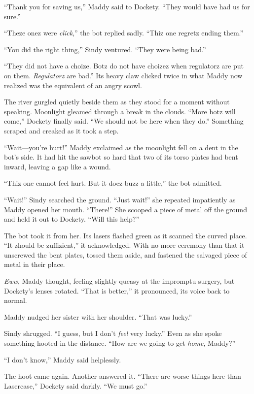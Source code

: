 \documentclass[10pt]{article}
\begin{document}
``Thank you for saving us,'' Maddy said to Dockety. ``They would have
had us for sure.''

``Theze onez were \emph{click},'' the bot replied sadly. ``Thiz one
regretz ending them.''

``You did the right thing,'' Sindy ventured. ``They were being bad.''

``They did not have a choize. Botz do not have choizez when regulatorz
are put on them. \emph{Regulatorz} are bad.'' Its heavy claw clicked
twice in what Maddy now realized was the equivalent of an angry scowl.

The river gurgled quietly beside them as they stood for a moment without
speaking. Moonlight gleamed through a break in the clouds. ``More botz
will come,'' Dockety finally said. ``We should not be here when they
do.'' Something scraped and creaked as it took a step.

``Wait---you're hurt!'' Maddy exclaimed as the moonlight fell on a dent
in the bot's side. It had hit the sawbot so hard that two of its torso
plates had bent inward, leaving a gap like a wound.

``Thiz one cannot feel hurt. But it doez buzz a little,'' the bot
admitted.

``Wait!'' Sindy searched the ground. ``Just wait!'' she repeated
impatiently as Maddy opened her mouth. ``There!'' She scooped a piece of
metal off the ground and held it out to Dockety. ``Will this help?''

The bot took it from her. Its lasers flashed green as it scanned the
curved place. ``It zhould be zuffizient,'' it acknowledged. With no more
ceremony than that it unscrewed the bent plates, tossed them aside, and
fastened the salvaged piece of metal in their place.

\emph{Eww}, Maddy thought, feeling slightly queasy at the impromptu
surgery, but Dockety's lenses rotated. ``That is better,'' it
pronounced, its voice back to normal.

Maddy nudged her sister with her shoulder. ``That was lucky.''

Sindy shrugged. ``I guess, but I don't \emph{feel} very lucky.'' Even as
she spoke something hooted in the distance. ``How are we going to get
\emph{home}, Maddy?''

``I don't know,'' Maddy said helplessly.

The hoot came again. Another answered it. ``There are worse things here
than Lasercase,'' Dockety said darkly. ``We must go.''
\end{document}
